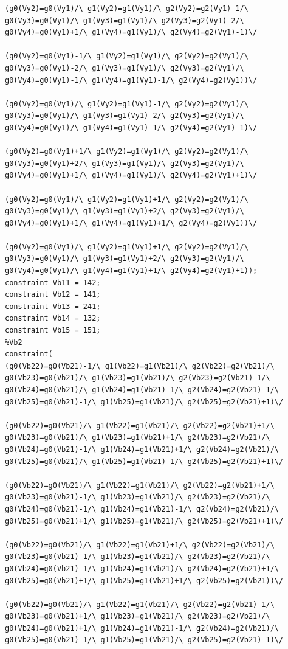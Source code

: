 \begin{appendices}
\begin{lstlisting}
(g0(Vy2)=g0(Vy1)/\ g1(Vy2)=g1(Vy1)/\ g2(Vy2)=g2(Vy1)-1/\ g0(Vy3)=g0(Vy1)/\ g1(Vy3)=g1(Vy1)/\ g2(Vy3)=g2(Vy1)-2/\ g0(Vy4)=g0(Vy1)+1/\ g1(Vy4)=g1(Vy1)/\ g2(Vy4)=g2(Vy1)-1)\/ 

(g0(Vy2)=g0(Vy1)-1/\ g1(Vy2)=g1(Vy1)/\ g2(Vy2)=g2(Vy1)/\ g0(Vy3)=g0(Vy1)-2/\ g1(Vy3)=g1(Vy1)/\ g2(Vy3)=g2(Vy1)/\ g0(Vy4)=g0(Vy1)-1/\ g1(Vy4)=g1(Vy1)-1/\ g2(Vy4)=g2(Vy1))\/ 

(g0(Vy2)=g0(Vy1)/\ g1(Vy2)=g1(Vy1)-1/\ g2(Vy2)=g2(Vy1)/\ g0(Vy3)=g0(Vy1)/\ g1(Vy3)=g1(Vy1)-2/\ g2(Vy3)=g2(Vy1)/\ g0(Vy4)=g0(Vy1)/\ g1(Vy4)=g1(Vy1)-1/\ g2(Vy4)=g2(Vy1)-1)\/ 

(g0(Vy2)=g0(Vy1)+1/\ g1(Vy2)=g1(Vy1)/\ g2(Vy2)=g2(Vy1)/\ g0(Vy3)=g0(Vy1)+2/\ g1(Vy3)=g1(Vy1)/\ g2(Vy3)=g2(Vy1)/\ g0(Vy4)=g0(Vy1)+1/\ g1(Vy4)=g1(Vy1)/\ g2(Vy4)=g2(Vy1)+1)\/ 

(g0(Vy2)=g0(Vy1)/\ g1(Vy2)=g1(Vy1)+1/\ g2(Vy2)=g2(Vy1)/\ g0(Vy3)=g0(Vy1)/\ g1(Vy3)=g1(Vy1)+2/\ g2(Vy3)=g2(Vy1)/\ g0(Vy4)=g0(Vy1)+1/\ g1(Vy4)=g1(Vy1)+1/\ g2(Vy4)=g2(Vy1))\/ 

(g0(Vy2)=g0(Vy1)/\ g1(Vy2)=g1(Vy1)+1/\ g2(Vy2)=g2(Vy1)/\ g0(Vy3)=g0(Vy1)/\ g1(Vy3)=g1(Vy1)+2/\ g2(Vy3)=g2(Vy1)/\ g0(Vy4)=g0(Vy1)/\ g1(Vy4)=g1(Vy1)+1/\ g2(Vy4)=g2(Vy1)+1));
constraint Vb11 = 142;
constraint Vb12 = 141;
constraint Vb13 = 241;
constraint Vb14 = 132;
constraint Vb15 = 151;
%Vb2
constraint(
(g0(Vb22)=g0(Vb21)-1/\ g1(Vb22)=g1(Vb21)/\ g2(Vb22)=g2(Vb21)/\ g0(Vb23)=g0(Vb21)/\ g1(Vb23)=g1(Vb21)/\ g2(Vb23)=g2(Vb21)-1/\ g0(Vb24)=g0(Vb21)/\ g1(Vb24)=g1(Vb21)-1/\ g2(Vb24)=g2(Vb21)-1/\ g0(Vb25)=g0(Vb21)-1/\ g1(Vb25)=g1(Vb21)/\ g2(Vb25)=g2(Vb21)+1)\/ 

(g0(Vb22)=g0(Vb21)/\ g1(Vb22)=g1(Vb21)/\ g2(Vb22)=g2(Vb21)+1/\ g0(Vb23)=g0(Vb21)/\ g1(Vb23)=g1(Vb21)+1/\ g2(Vb23)=g2(Vb21)/\ g0(Vb24)=g0(Vb21)-1/\ g1(Vb24)=g1(Vb21)+1/\ g2(Vb24)=g2(Vb21)/\ g0(Vb25)=g0(Vb21)/\ g1(Vb25)=g1(Vb21)-1/\ g2(Vb25)=g2(Vb21)+1)\/ 

(g0(Vb22)=g0(Vb21)/\ g1(Vb22)=g1(Vb21)/\ g2(Vb22)=g2(Vb21)+1/\ g0(Vb23)=g0(Vb21)-1/\ g1(Vb23)=g1(Vb21)/\ g2(Vb23)=g2(Vb21)/\ g0(Vb24)=g0(Vb21)-1/\ g1(Vb24)=g1(Vb21)-1/\ g2(Vb24)=g2(Vb21)/\ g0(Vb25)=g0(Vb21)+1/\ g1(Vb25)=g1(Vb21)/\ g2(Vb25)=g2(Vb21)+1)\/ 

(g0(Vb22)=g0(Vb21)/\ g1(Vb22)=g1(Vb21)+1/\ g2(Vb22)=g2(Vb21)/\ g0(Vb23)=g0(Vb21)-1/\ g1(Vb23)=g1(Vb21)/\ g2(Vb23)=g2(Vb21)/\ g0(Vb24)=g0(Vb21)-1/\ g1(Vb24)=g1(Vb21)/\ g2(Vb24)=g2(Vb21)+1/\ g0(Vb25)=g0(Vb21)+1/\ g1(Vb25)=g1(Vb21)+1/\ g2(Vb25)=g2(Vb21))\/ 

(g0(Vb22)=g0(Vb21)/\ g1(Vb22)=g1(Vb21)/\ g2(Vb22)=g2(Vb21)-1/\ g0(Vb23)=g0(Vb21)+1/\ g1(Vb23)=g1(Vb21)/\ g2(Vb23)=g2(Vb21)/\ g0(Vb24)=g0(Vb21)+1/\ g1(Vb24)=g1(Vb21)-1/\ g2(Vb24)=g2(Vb21)/\ g0(Vb25)=g0(Vb21)-1/\ g1(Vb25)=g1(Vb21)/\ g2(Vb25)=g2(Vb21)-1)\/ 


\end{lstlisting}
\end{appendices}
